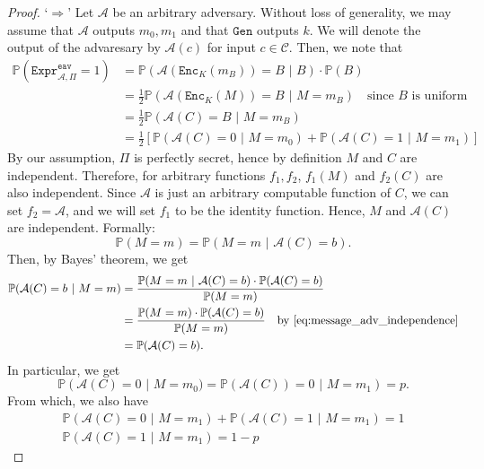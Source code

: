 \documentclass{article}
\theoremstyle{definition}
\theoremstyle{example}
\newcommand{\Enc}{\texttt{Enc}}
\newcommand{\Gen}{\texttt{Gen}}
\renewcommand{\C}{\mathcal{C}}
\newcommand{\A}{\mathcal{A}}
\newcommand{\Prob}{\mathbb{P}}
\newcommand{\Expr}[2]{\texttt{Expr}^{\texttt{#1}}_{#2}}
\begin{document}
\begin{proof}
  `$\Rightarrow$' Let $\A$ be an arbitrary adversary. Without loss
  of generality, we may assume that $\A$ outputs $m_0, m_1$ and that $\Gen$
  outputs $k$. We will denote the output of the advaresary by $\A(c)$ for input
  $c \in \C$. Then, we note that
  \begin{equation}
    \begin{split}
    \label{eq:perf_adv_message_dependency}
    \Prob(\Expr{eav}{\A, \Pi} = 1) &= \Prob(\A(\Enc_K(m_B)) = B \,\,|\,\, B) \cdot \Prob(B) \\
                                   &= \frac12 \Prob(\A(\Enc_K(M)) = B \,\,|\,\, M = m_B) \quad\text{since $B$ is uniform}\\
                                   &= \frac12 \Prob(\A(C) = B \,\,|\,\, M = m_B) \\
                                   &= \frac12 \left[ \Prob(\A(C) = 0 \,\,|\,\, M = m_0) + \Prob(\A(C) = 1 \,\,|\,\, M = m_1) \right]
    \end{split}
  \end{equation}
  By our assumption, $\Pi$ is perfectly secret, hence by definition $M$ and $C$
  are independent. Therefore, for arbitrary functions $f_1, f_2$, $f_1(M)$ and
  $f_2(C)$ are also independent\footnotemark . Since $\A$ is just an arbitrary
  computable function of $C$, we can set $f_2 = \A$, and we will set $f_1$ to be
  the identity function. Hence, $M$ and $\A(C)$ are independent. Formally:
  \begin{equation}
    \label{eq:message_adv_independence}
    \Prob(M = m) = \Prob(M = m\,\,|\,\, \A(C) = b).
  \end{equation}
  Then, by Bayes' theorem, we get
  \begin{align*}
    \Prob(\A(C) = b\,\, |\,\, M = m) &= \frac{\Prob(M = m\,\,|\,\,\A(C) = b)\cdot\Prob(\A(C) = b)}{\Prob(M = m)}\\
                     &= \frac{\Prob(M = m)\cdot\Prob(\A(C) = b)}{\Prob(M = m)}\quad\text{by \ref{eq:message_adv_independence}}\\
                     &= \Prob(\A(C) = b).
  \end{align*}
  In particular, we get
  \[
    \Prob(\A(C) = 0 \,\,|\,\, M = m_0) = \Prob(\A(C)) = 0 \,\,|\,\, M = m_1) = p.
  \]
  From which, we also have 
  \begin{gather*}
    \Prob(\A(C) = 0\,\,|\,\, M = m_1) + \Prob(\A(C) = 1 \,\,|\,\, M = m_1) = 1
    \\
    \Prob(\A(C) = 1 \,\,|\,\, M = m_1) = 1 - p

\end{gather*}
\end{proof}
\end{document}

